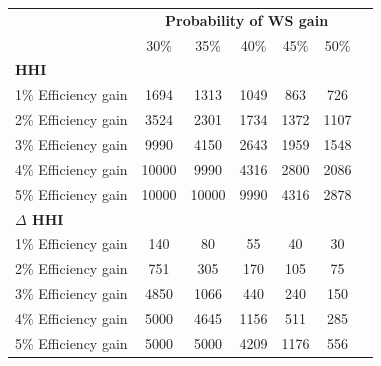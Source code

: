 \begin{tabular}{lcccccc}
\toprule
 & \multicolumn{5}{c}{\textbf{Probability of WS gain}} \\ 
 & 30$\%$ & 35$\%$ & 40$\%$ & 45$\%$ & 50$\%$ \\ 
\midrule
\multicolumn{6}{l}{\textbf{HHI}} \\ 
1$\%$ Efficiency gain & 1694 & 1313 & 1049 &  863 &  726\\ 
2$\%$ Efficiency gain & 3524 & 2301 & 1734 & 1372 & 1107\\ 
3$\%$ Efficiency gain & 9990 & 4150 & 2643 & 1959 & 1548\\ 
4$\%$ Efficiency gain & 10000 & 9990 & 4316 & 2800 & 2086\\ 
5$\%$ Efficiency gain & 10000 & 10000 & 9990 & 4316 & 2878\\ 
\midrule
\multicolumn{6}{l}{\textbf{$\Delta$ HHI}} \\ 
1$\%$ Efficiency gain &  140 &   80 &   55 &   40 &   30 \\ 
2$\%$ Efficiency gain &  751 &  305 &  170 &  105 &   75 \\ 
3$\%$ Efficiency gain & 4850 & 1066 &  440 &  240 &  150 \\ 
4$\%$ Efficiency gain & 5000 & 4645 & 1156 &  511 &  285 \\ 
5$\%$ Efficiency gain & 5000 & 5000 & 4209 & 1176 &  556 \\ 
\bottomrule 
\end{tabular}
